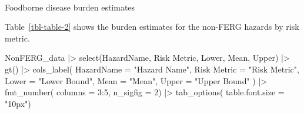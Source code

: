 \documentclass[
  letterpaper,
  DIV=11,
  numbers=noendperiod]{scrartcl}
\makeatletter
\let\oldparagraph\paragraph
\renewcommand{\paragraph}{
    \@ifstar
      \xxxParagraphStar
      \xxxParagraphNoStar
  }
\newcommand{\xxxParagraphStar}[1]{\oldparagraph*{#1}\mbox{}}
\newcommand{\xxxParagraphNoStar}[1]{\oldparagraph{#1}\mbox{}}
\newenvironment{Shaded}{\begin{snugshade}}{\end{snugshade}}
\newcommand{\AttributeTok}[1]{\textcolor[rgb]{0.40,0.45,0.13}{#1}}
\newcommand{\DecValTok}[1]{\textcolor[rgb]{0.68,0.00,0.00}{#1}}
\newcommand{\FunctionTok}[1]{\textcolor[rgb]{0.28,0.35,0.67}{#1}}
\newcommand{\NormalTok}[1]{\textcolor[rgb]{0.00,0.23,0.31}{#1}}
\newcommand{\OtherTok}[1]{\textcolor[rgb]{0.00,0.23,0.31}{#1}}
\newcommand{\SpecialCharTok}[1]{\textcolor[rgb]{0.37,0.37,0.37}{#1}}
\newcommand{\StringTok}[1]{\textcolor[rgb]{0.13,0.47,0.30}{#1}}
\makeatother
\begin{document}
\newpage{}

\paragraph{Foodborne disease burden
estimates}\label{foodborne-disease-burden-estimates}

Table~\ref{tbl-table-2} shows the burden estimates for the non-FERG
hazards by risk metric.

\begin{Shaded}
\begin{Highlighting}[]
\NormalTok{NonFERG\_data }\SpecialCharTok{|\textgreater{}} 
  \FunctionTok{select}\NormalTok{(HazardName, }\StringTok{\textasciigrave{}}\AttributeTok{Risk Metric}\StringTok{\textasciigrave{}}\NormalTok{, Lower, Mean, Upper) }\SpecialCharTok{|\textgreater{}}
\FunctionTok{gt}\NormalTok{() }\SpecialCharTok{|\textgreater{}} 
  \FunctionTok{cols\_label}\NormalTok{(}
    \AttributeTok{HazardName =} \StringTok{"Hazard Name"}\NormalTok{, }
    \StringTok{\textasciigrave{}}\AttributeTok{Risk Metric}\StringTok{\textasciigrave{}} \OtherTok{=} \StringTok{"Risk Metric"}\NormalTok{, }
    \AttributeTok{Lower =} \StringTok{"Lower Bound"}\NormalTok{, }
    \AttributeTok{Mean =} \StringTok{"Mean"}\NormalTok{, }
    \AttributeTok{Upper =} \StringTok{"Upper Bound"}
\NormalTok{  ) }\SpecialCharTok{|\textgreater{}}
 \FunctionTok{fmt\_number}\NormalTok{(}
 \AttributeTok{columns =} \DecValTok{3}\SpecialCharTok{:}\DecValTok{5}\NormalTok{, }
 \AttributeTok{n\_sigfig =} \DecValTok{2}\NormalTok{) }\SpecialCharTok{|\textgreater{}} 
  \FunctionTok{tab\_options}\NormalTok{(}
    \AttributeTok{table.font.size =} \StringTok{"10px"}\NormalTok{)}
\end{Highlighting}
\end{Shaded}
\end{document}
